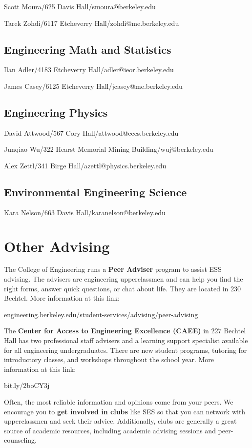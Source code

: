Scott Moura/625 Davis Hall/{\selectfont smoura@berkeley.edu}

Tarek Zohdi/6117 Etcheverry Hall/{\selectfont zohdi@me.berkeley.edu}

\subsection*{Engineering Math and Statistics}

Ilan Adler/4183 Etcheverry Hall/{\selectfont adler@ieor.berkeley.edu}

James Casey/6125 Etcheverry Hall/{\selectfont jcasey@me.berkeley.edu}

\subsection*{Engineering Physics}

David Attwood/567 Cory Hall/{\selectfont attwood@eecs.berkeley.edu}

Junqiao Wu/322 Hearst Memorial Mining Building/{\selectfont wuj@berkeley.edu}

Alex Zettl/341 Birge Hall/{\selectfont azettl@physics.berkeley.edu}

\subsection*{Environmental Engineering Science}

Kara Nelson/663 Davis Hall/{\selectfont karanelson@berkeley.edu}

\section*{Other Advising}

The College of Engineering runs a \textbf{Peer Adviser} program to assist ESS advising. The advisers are engineering upperclassmen and can help you find the right forms, answer quick questions, or chat about life. They are located in 230 Bechtel. More information at this link:

{\selectfont engineering.berkeley.edu/student-services/advising/peer-advising}

The \textbf{Center for Access to Engineering Excellence (CAEE)} in 227 Bechtel Hall has two professional staff advisers and a learning support specialist available for all engineering undergraduates. There are new student programs, tutoring for introductory classes, and workshops throughout the school year. More information at this link:

{\selectfont bit.ly/2boCY3j}

Often, the most reliable information and opinions come from your peers. We encourage you to \textbf{get involved in clubs} like SES so that you can network with upperclassmen and seek their advice. Additionally, clubs are generally a great source of academic resources, including academic advising sessions and peer-counseling.

